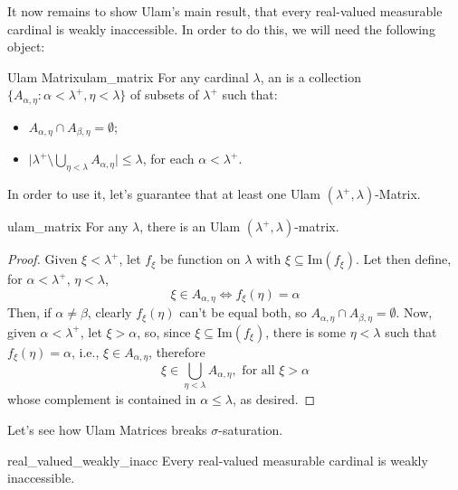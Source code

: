 It now remains to show Ulam's main result, that every real-valued measurable cardinal is weakly inaccessible. In order to do this, we will need the following object:

\begin{definition}{Ulam Matrix}{ulam_matrix}
    For any cardinal $\lambda$, an  is a collection $\{A_{\alpha,\eta}:\alpha<\lambda^+,\eta<\lambda\}$
    of subsets of $\lambda^+$ such that:
    \begin{itemize}
        \item $A_{\alpha,\eta}\cap A_{\beta,\eta}=\emptyset$;
        \item $\lvert\lambda^+\setminus\bigcup_{\eta<\lambda}A_{\alpha,\eta}\rvert\leq\lambda$, for each $\alpha<\lambda^+$.
    \end{itemize}
\end{definition}

In order to use it, let's guarantee that at least one Ulam $(\lambda^+,\lambda)$-Matrix.

\begin{lemma}{}{ulam_matrix}
    For any $\lambda$, there is an Ulam $(\lambda^+,\lambda)$-matrix.
\end{lemma}

\begin{proof}
    Given $\xi<\lambda^+$, let $f_\xi$ be function on $\lambda$ with $\xi\subseteq\text{Im}(f_\xi)$. Let then define, for $\alpha<\lambda^+$, $\eta<\lambda$,
    $$\xi\in A_{\alpha,\eta}\iff f_\xi(\eta)=\alpha$$
    Then, if $\alpha\neq\beta$, clearly $f_\xi(\eta)$ can't be equal both, so $A_{\alpha,\eta}\cap A_{\beta,\eta}=\emptyset$. Now, given $\alpha<\lambda^+$, let $\xi>\alpha$, so, since $\xi\subseteq\text{Im}(f_\xi)$, there is some $\eta<\lambda$ such that $f_\xi(\eta)=\alpha$, i.e., $\xi\in A_{\alpha,\eta}$, therefore
    $$\xi\in\bigcup_{\eta<\lambda}A_{\alpha,\eta},\text{ for all }\xi>\alpha$$
    whose complement is contained in $\alpha\leq\lambda$, as desired.
\end{proof}

Let's see how Ulam Matrices breaks $\sigma$-saturation.

\begin{theorem}{}{real_valued_weakly_inacc}
    Every real-valued measurable cardinal is weakly inaccessible.
\end{theorem}

